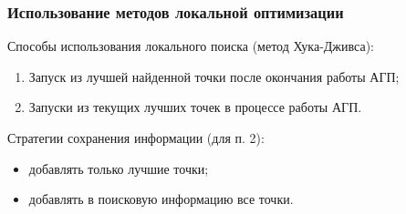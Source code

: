 \documentclass[aspectratio=1610]{beamer}
\begin{document}
\begin{frame}
\frametitle{Использование методов локальной оптимизации}
Способы использования локального поиска (метод Хука-Дживса):\
\begin{enumerate}
  \item Запуск из лучшей найденной точки после окончания работы АГП;
  \item Запуски из текущих лучших точек в процессе работы АГП.
\end{enumerate}
\bigbreak
Стратегии сохранения информации (для п. 2):
\begin{itemize}
  \item добавлять только лучшие точки;
  \item добавлять в поисковую информацию все точки.
\end{itemize}
\end{frame}
\end{document}
